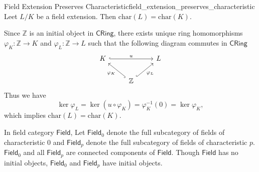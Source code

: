 \begin{proposition}{Field Extension Preserves Characteristic}{field_extension_preserves_characteristic}
    Leet $L/K$ be a field extension. Then $\mathrm{char}(L)=\mathrm{char}(K)$.
\end{proposition}
\begin{prf}
    Since $\mathbb{Z}$ is an initial object in $\mathsf{CRing}$, there exists unique ring homomorphisms $\varphi_K:\mathbb{Z}\to K$ and $\varphi_L:\mathbb{Z}\to L$ such that the following diagram commutes in $\mathsf{CRing}$
    \[
        \begin{tikzcd}
            K \arrow[rr, "u", hook] &                                                                         & L \\
                                    & \mathbb{Z} \arrow[lu, "\varphi_K", hook] \arrow[ru, "\varphi_L"', hook] &  
        \end{tikzcd}
    \]
    Thus we have
    \[
    \ker \varphi_L = \ker\left(u\circ \varphi_K\right)= \varphi_K^{-1}(0)=\ker \varphi_K,
    \]
    which implies $\mathrm{char}(L)=\mathrm{char}(K)$.
\end{prf}

In field category $\mathsf{Field}$, Let $\mathsf{Field}_0$ denote the full subcategory of fields of characteristic $0$ and $\mathsf{Field}_p$ denote the full subcategory of fields of characteristic $p$. $\mathsf{Field}_0$ and all $\mathsf{Field}_p$ are connected components of $\mathsf{Field}$. Though $\mathsf{Field}$ has no initial objects, $\mathsf{Field}_0$ and $\mathsf{Field}_p$ have initial objects.

